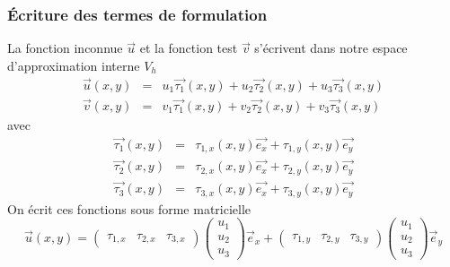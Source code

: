 \documentclass[a4paper,12pt]{article}
\begin{document}
\subsubsection{Écriture des termes de formulation}
La fonction inconnue $\vec{u}$ et la fonction test $\vec{v}$ s'écrivent dans notre espace d'approximation interne $V_{h}$
\begin{eqnarray*}
\vec{u}(x,y) &=& u_{1} \vec{\tau_{1}}(x,y) + u_{2} \vec{\tau_{2}}(x,y) + u_{3} \vec{\tau_{3}}(x,y) \\
\vec{v}(x,y) &=& v_{1} \vec{\tau_{1}}(x,y) + v_{2} \vec{\tau_{2}}(x,y) + v_{3} \vec{\tau_{3}}(x,y)
\end{eqnarray*}
avec
\begin{eqnarray*}
\vec{\tau_{1}}(x,y) &=& \tau_{1,x}(x,y)\vec{e_{x}} + \tau_{1,y}(x,y)\vec{e_{y}} \\
\vec{\tau_{2}}(x,y) &=& \tau_{2,x}(x,y)\vec{e_{x}} + \tau_{2,y}(x,y)\vec{e_{y}} \\
\vec{\tau_{3}}(x,y) &=& \tau_{3,x}(x,y)\vec{e_{x}} + \tau_{3,y}(x,y)\vec{e_{y}}
\end{eqnarray*}
On écrit ces fonctions sous forme matricielle
\begin{equation*}
\vec{u}(x,y) =
\begin{pmatrix}
  \tau_{1,x} & \tau_{2,x} & \tau_{3,x}
\end{pmatrix}
\begin{pmatrix}
  u_{1} \\ u_{2} \\ u_{3}
\end{pmatrix}
\vec{e}_{x}
+
\begin{pmatrix}
  \tau_{1,y} & \tau_{2,y} & \tau_{3,y}
\end{pmatrix}
\begin{pmatrix} 
  u_{1} \\ u_{2} \\ u_{3}
\end{pmatrix}
\vec{e}_{y}
\end{equation*}
\end{document}
